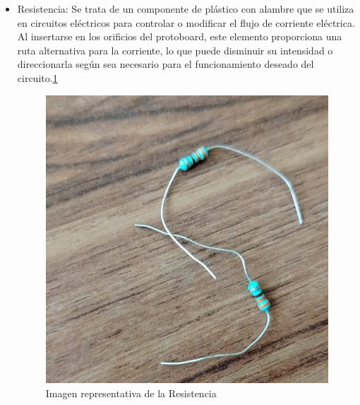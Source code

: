     \begin{itemize}
        \item Resistencia: Se trata de un componente de plástico con alambre que se utiliza en circuitos eléctricos para controlar o modificar el flujo de corriente eléctrica. Al insertarse en los orificios del protoboard, este elemento proporciona una ruta alternativa para la corriente, lo que puede disminuir su intensidad o direccionarla según sea necesario para el funcionamiento deseado del circuito.\ref{fig:Resistencia}
    
          \begin{figure}[H]
            \centering
            \includegraphics[trim = {0mm 0mm 0mm 0mm},clip,scale=0.1]{12/Img/resistencia.jpg}
            \caption{Imagen representativa de la Resistencia}
            \label{fig:Resistencia}
        \end{figure}
    \end{itemize}
    
